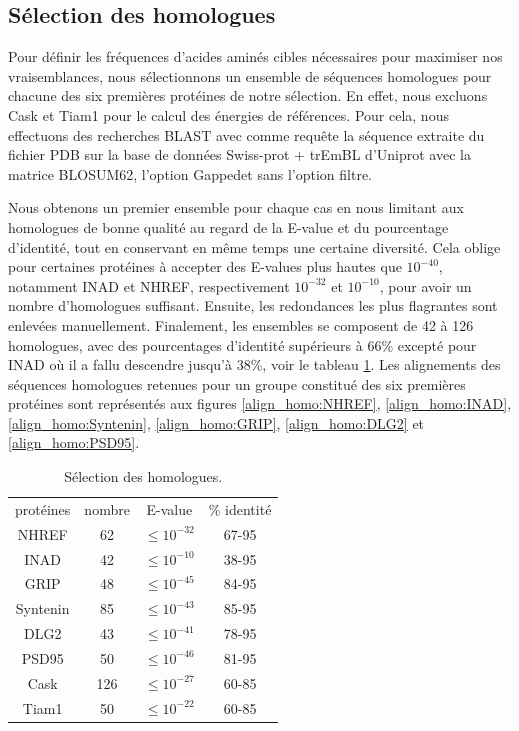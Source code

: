 \subsection{Sélection des homologues}

Pour définir les fréquences d'acides aminés cibles nécessaires pour maximiser nos vraisemblances, nous sélectionnons un ensemble de séquences homologues pour chacune des six premières protéines de notre sélection. En effet, nous excluons Cask et Tiam1 pour le calcul des énergies de références. Pour cela, nous effectuons des recherches BLAST avec comme requête la séquence extraite du fichier PDB sur la base de données \og Swiss-prot + trEmBL \fg d'Uniprot avec la matrice BLOSUM62, l'option \og Gapped\fg et sans l'option \og filtre\fg.

Nous obtenons un premier ensemble pour chaque cas en nous limitant aux homologues de bonne qualité au regard de la E-value et du pourcentage d'identité, tout en conservant en même temps une certaine diversité. Cela oblige pour certaines protéines à accepter des E-values plus hautes que $10^{-40}$, notamment INAD et NHREF, respectivement $10^{-32}$ et $10^{-10}$, pour avoir un nombre d'homologues suffisant. Ensuite, les redondances les plus flagrantes sont enlevées manuellement. Finalement, les ensembles se composent de 42 à 126 homologues, avec des pourcentages d'identité supérieurs à 66\% excepté pour INAD où il a fallu descendre jusqu'à 38\%, voir le tableau \ref{tab:select_homo}. Les alignements des séquences homologues retenues pour un groupe constitué des six premières protéines sont représentés aux figures \ref{align_homo:NHREF}, \ref{align_homo:INAD}, \ref{align_homo:Syntenin}, \ref{align_homo:GRIP}, \ref{align_homo:DLG2} et \ref{align_homo:PSD95}.
 

    \begin{table}[!htbp]
      \centering
      \caption{Sélection des homologues.}
      \begin{tabular}{cccc}

        \toprule
        protéines & nombre & E-value & \% identité \\
        \cmidrule{1-4}
     NHREF     & 62  &    $\leqslant 10^{-32}$  &  67-95 \\
     INAD      & 42  &    $\leqslant 10^{-10}$  &  38-95 \\
     GRIP      & 48  &    $\leqslant 10^{-45}$  &  84-95 \\
     Syntenin  & 85  &    $\leqslant 10^{-43}$  &  85-95 \\
     DLG2      & 43  &    $\leqslant 10^{-41}$  &  78-95 \\
     PSD95     & 50  &    $\leqslant 10^{-46}$  &  81-95 \\
     \cmidrule{1-4}
     Cask      & 126 &    $\leqslant 10^{-27}$  &  60-85 \\
     Tiam1     & 50  &    $\leqslant 10^{-22}$  &  60-85 \\

        \bottomrule

      \end{tabular}      
      \label{tab:select_homo}
    \end{table}

